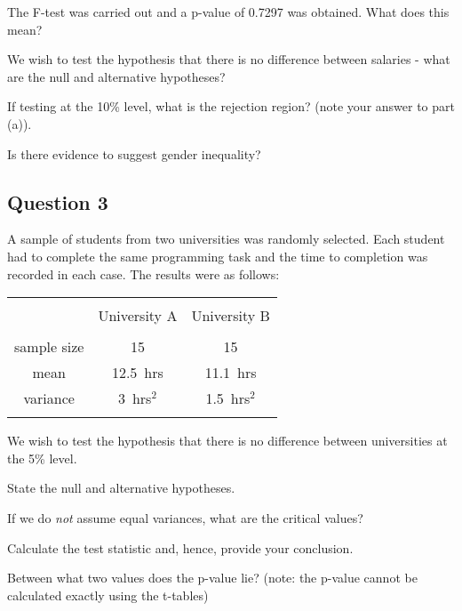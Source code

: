 \documentclass[a4paper,12pt]{article}
\begin{document}
\item  The F-test was carried out and a p-value of 0.7297 was obtained. What does this mean? 
 
\item  We wish to test the hypothesis that there is no difference between salaries - what are the null and alternative hypotheses? 
 
\item  If testing at the 10\% level, what is the rejection region? (note your answer to part (a)). 
 
\item  Is there evidence to suggest gender inequality?



\subsection*{Question 3}
A sample of students from two universities was randomly selected. 
Each student had to complete the same programming task and the time to completion was recorded in each case. 
The results were as follows: \\

\begin{center}
\begin{tabular}{|c|c|c|}
\hline
&&\\[-0.4cm]
& University A & University B \\
\hline
&&\\[-0.4cm]
sample size & 15 & 15 \\
mean & 12.5\,\,\,hrs & 11.1\,\,\,hrs \\
variance & 3\,\,\,hrs$^2$ & 1.5\,\,\,hrs$^2$ \\
\hline
\multicolumn{3}{c}{}\\
\end{tabular}
\end{center}

We wish to test the hypothesis that there is no difference between universities at the 5\% level.\\[0.2cm]
\item  State the null and alternative hypotheses. 
 
\item  If we do \emph{not} assume equal variances, what are the critical values? 
 
\item  Calculate the test statistic and, hence, provide your conclusion. 
 
\item  Between what two values does the p-value lie? (note: the p-value cannot be calculated exactly using the t-tables)
\end{document}
